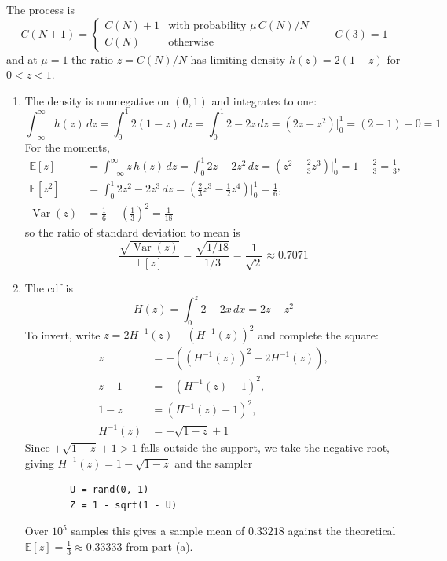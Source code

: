 \documentclass[11pt]{article}
\begin{document}
The process is
\[
    C(N+1) = \begin{cases}
        C(N) + 1 & \text{with probability } \mu\,C(N)/N \\
        C(N)     & \text{otherwise}
    \end{cases}
    \qquad C(3) = 1
\]
and at $\mu = 1$ the ratio $z = C(N)/N$ has limiting density $h(z) = 2(1-z)$ for $0 < z < 1$.

\begin{enumerate}[label=(\alph*)]
    \item
    The density is nonnegative on $(0,1)$ and integrates to one:
    \[
        \int_{-\infty}^{\infty} h(z) \, dz = \int_{0}^{1} 2(1-z) \, dz = \int_{0}^{1} 2 - 2z \, dz
        = \left(2z - z^2\right)\Big|_{0}^{1} = (2 - 1) - 0 = 1
    \]
    For the moments,
    \begin{align*}
        \mathbb{E}[z] &= \int_{-\infty}^{\infty} z\,h(z) \, dz = \int_{0}^{1} 2z - 2z^2 \, dz
        = \left(z^2 - \frac{2}{3}z^3\right)\Big|_{0}^{1} = 1 - \frac{2}{3} = \frac{1}{3}, \\
        \mathbb{E}[z^2] &= \int_{0}^{1} 2z^2 - 2z^3 \, dz
        = \left(\frac{2}{3}z^3 - \frac{1}{2}z^4\right)\Big|_{0}^{1} = \frac{1}{6}, \\
        \operatorname{Var}(z) &= \frac{1}{6} - \left(\frac{1}{3}\right)^2 = \frac{1}{18}
    \end{align*}
    so the ratio of standard deviation to mean is
    \[
        \frac{\sqrt{\operatorname{Var}(z)}}{\mathbb{E}[z]} = \frac{\sqrt{1/18}}{1/3}
        = \frac{1}{\sqrt{2}} \approx \num{0.7071}
    \]

    \item
    The cdf is
    \[
        H(z) = \int_{0}^{z} 2 - 2x \, dx = 2z - z^2
    \]
    To invert, write $z = 2H^{-1}(z) - \left(H^{-1}(z)\right)^2$ and complete the square:
    \begin{align*}
        z &= -\left(\left(H^{-1}(z)\right)^2 - 2H^{-1}(z)\right), \\
        z - 1 &= -\left(H^{-1}(z) - 1\right)^2, \\
        1 - z &= \left(H^{-1}(z) - 1\right)^2, \\
        H^{-1}(z) &= \pm\sqrt{1-z} + 1
    \end{align*}
    Since $+\sqrt{1-z} + 1 > 1$ falls outside the support, we take the negative root, giving
    $H^{-1}(z) = 1 - \sqrt{1-z}$ and the sampler
    \begin{verbatim}
        U = rand(0, 1)
        Z = 1 - sqrt(1 - U)
    \end{verbatim}
    Over $10^5$ samples this gives a sample mean of $\num{0.33218}$ against the theoretical
    $\mathbb{E}[z] = \frac{1}{3} \approx \num{0.33333}$ from part (a).


\end{enumerate}
\end{document}
